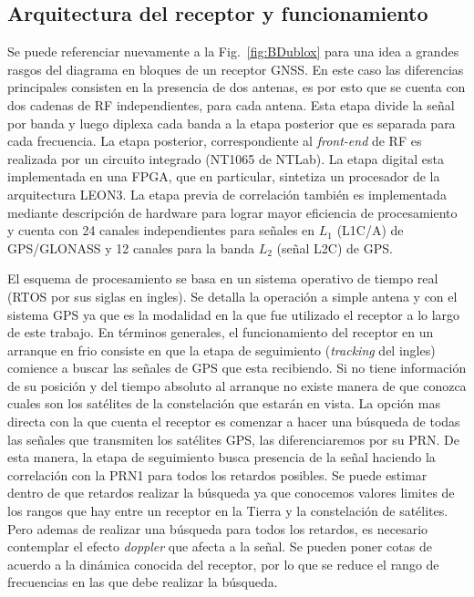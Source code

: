 \documentclass[a4paper,12pt,oneside,onecolumn,final,openright]{book}%
\begin{document}
\subsection{Arquitectura del receptor y funcionamiento}\label{sec:Qarq}
	Se puede referenciar nuevamente a la Fig.~\ref{fig:BDublox} para una idea a grandes rasgos del diagrama en bloques de un receptor GNSS. En este caso las diferencias principales consisten en la presencia de dos antenas, es por esto que se cuenta con dos cadenas de RF independientes, para cada antena. Esta etapa divide la señal por banda y luego diplexa cada banda a la etapa posterior que es separada para cada frecuencia. La etapa posterior, correspondiente al \textit{front-end} de RF es realizada por un circuito integrado (NT1065 de NTLab). La etapa digital esta implementada en una FPGA, que en particular, sintetiza un procesador de la arquitectura LEON3. La etapa previa de correlación también es implementada mediante descripción de hardware para lograr mayor eficiencia de procesamiento y cuenta con 24 canales independientes para señales en $L_1$ (L1C/A) de GPS/GLONASS y 12 canales para la banda $L_2$ (señal L2C) de GPS.

	El esquema de procesamiento se basa en un sistema operativo de tiempo real (RTOS por sus siglas en ingles). Se detalla la operación a simple antena y con el sistema GPS ya que es la modalidad en la que fue utilizado el receptor a lo largo de este trabajo. En términos generales, el funcionamiento del receptor en un arranque en frio consiste en que la etapa de seguimiento (\textit{tracking} del ingles) comience a buscar las señales de GPS que esta recibiendo. Si no tiene información de su posición y del tiempo absoluto al arranque no existe manera de que conozca cuales son los satélites de la constelación que estarán en vista. La opción mas directa con la que cuenta el receptor es comenzar a hacer una búsqueda de todas las señales que transmiten los satélites GPS, las diferenciaremos por su PRN. De esta manera, la etapa de seguimiento busca presencia de la señal haciendo la correlación con la PRN1 para todos los retardos posibles. Se puede estimar dentro de que retardos realizar la búsqueda ya que conocemos valores limites de los rangos que hay entre un receptor en la Tierra y la constelación de satélites. Pero ademas de realizar una búsqueda para todos los retardos, es necesario contemplar el efecto \textit{doppler} que afecta a la señal. Se pueden poner cotas de acuerdo a la dinámica conocida del receptor, por lo que se reduce el rango de frecuencias en las que debe realizar la búsqueda.
	
\end{document}
